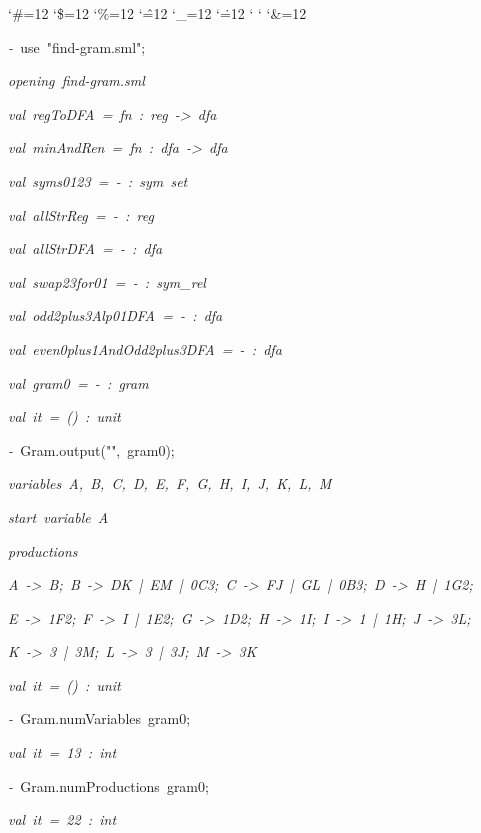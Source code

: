\begin{list}{}
{\setlength{\leftmargin}{\leftmargini}
\setlength{\rightmargin}{0cm}
\setlength{\itemindent}{0cm}
\setlength{\listparindent}{0cm}
\setlength{\itemsep}{0cm}
\setlength{\parsep}{0cm}
\setlength{\labelsep}{0cm}
\setlength{\labelwidth}{0cm}
\catcode`\#=12
\catcode`\$=12
\catcode`\%=12
\catcode`\^=12
\catcode`\_=12
\catcode`\.=12
\catcode`
\catcode`
\catcode`\&=12
\ttfamily}
\small
\item[]\textsl{-\ }use\ "find-gram.sml";
\item[]\textsl{opening\ find-gram.sml}
\item[]\textsl{val\ regToDFA\ =\ fn\ :\ reg\ ->\ dfa}
\item[]\textsl{val\ minAndRen\ =\ fn\ :\ dfa\ ->\ dfa}
\item[]\textsl{val\ syms0123\ =\ -\ :\ sym\ set}
\item[]\textsl{val\ allStrReg\ =\ -\ :\ reg}
\item[]\textsl{val\ allStrDFA\ =\ -\ :\ dfa}
\item[]\textsl{val\ swap23for01\ =\ -\ :\ sym_rel}
\item[]\textsl{val\ odd2plus3Alp01DFA\ =\ -\ :\ dfa}
\item[]\textsl{val\ even0plus1AndOdd2plus3DFA\ =\ -\ :\ dfa}
\item[]\textsl{val\ gram0\ =\ -\ :\ gram}
\item[]\textsl{val\ it\ =\ ()\ :\ unit}
\item[]\textsl{-\ }Gram.output("",\ gram0);
\item[]\textsl{variables\ A,\ B,\ C,\ D,\ E,\ F,\ G,\ H,\ I,\ J,\ K,\ L,\ M}
\item[]\textsl{start\ variable\ A}
\item[]\textsl{productions}
\item[]\textsl{A\ ->\ B;\ B\ ->\ DK\ |\ EM\ |\ 0C3;\ C\ ->\ FJ\ |\ GL\ |\ 0B3;\ D\ ->\ H\ |\ 1G2;}
\item[]\textsl{E\ ->\ 1F2;\ F\ ->\ I\ |\ 1E2;\ G\ ->\ 1D2;\ H\ ->\ 1I;\ I\ ->\ 1\ |\ 1H;\ J\ ->\ 3L;}
\item[]\textsl{K\ ->\ 3\ |\ 3M;\ L\ ->\ 3\ |\ 3J;\ M\ ->\ 3K}
\item[]\textsl{val\ it\ =\ ()\ :\ unit}
\item[]\textsl{-\ }Gram.numVariables\ gram0;
\item[]\textsl{val\ it\ =\ 13\ :\ int}
\item[]\textsl{-\ }Gram.numProductions\ gram0;
\item[]\textsl{val\ it\ =\ 22\ :\ int}
\end{list}
